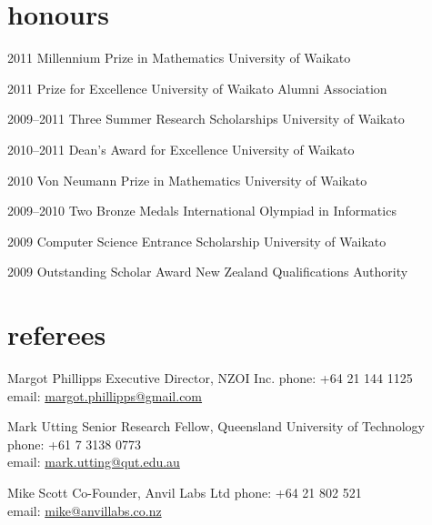 \documentclass[]{boris-cv}
\begin{document}
\section{honours}
\begin{entrylist}
  \titleentry
    {2011}
    {Millennium Prize in Mathematics}
    {University of Waikato}

  \titleentry
    {2011}
    {Prize for Excellence}
    {University of Waikato Alumni Association}

  \titleentry
    {2009--2011}
    {Three Summer Research Scholarships}
    {University of Waikato}

  \titleentry
    {2010--2011}
    {Dean's Award for Excellence}
    {University of Waikato}

  \titleentry
    {2010}
    {Von Neumann Prize in Mathematics}
    {University of Waikato}

  \titleentry
    {2009--2010}
    {Two Bronze Medals}
    {International Olympiad in Informatics}

  \titleentry
    {2009}
    {Computer Science Entrance Scholarship}
    {University of Waikato}

  \titleentry
    {2009}
    {Outstanding Scholar Award}
    {New Zealand Qualifications Authority}
\end{entrylist}

\section{referees}

  {Margot Phillipps}
  {Executive Director, NZOI Inc.}
  {phone: +64 21 144 1125
  \\email: \href{mailto:margot.phillipps@gmail.com}{margot.phillipps@gmail.com}}

  {Mark Utting}
  {Senior Research Fellow, Queensland University of Technology}
  {phone: +61 7 3138 0773
  \\email: \href{mailto:mark.utting@qut.edu.au}{mark.utting@qut.edu.au}}

  {Mike Scott}
  {Co-Founder, Anvil Labs Ltd}
  {phone: +64 21 802 521
  \\email: \href{mailto:mike@anvillabs.co.nz}{mike@anvillabs.co.nz}}
\end{document}
